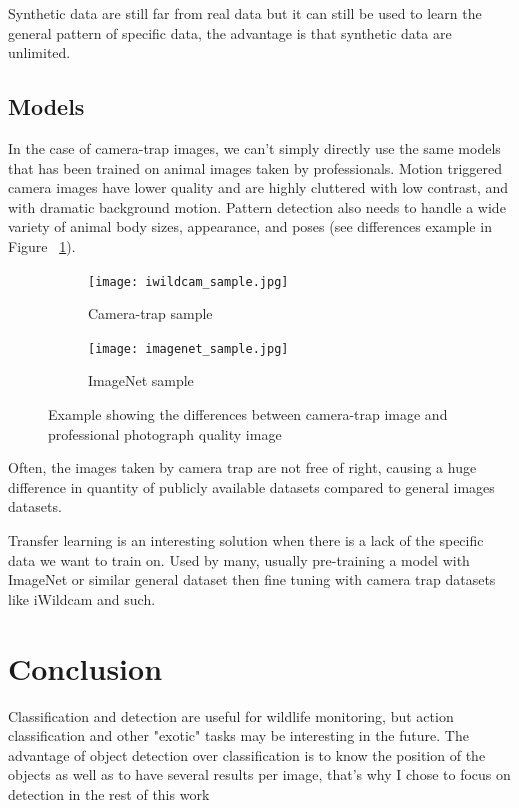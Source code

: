 Synthetic data are still far from real data but it can still be used to learn the general pattern of specific data, the advantage is that synthetic data are unlimited.

\pagebreak\subsection{Models}

In the case of camera-trap images, we can't simply directly use the same models that has been trained on animal images taken by professionals.
Motion triggered camera images have lower quality and are highly cluttered with low contrast, and with dramatic background motion. Pattern detection also needs to handle a wide variety of animal body sizes, appearance, and poses (see differences example in Figure ~\ref{fig:camtraprealcam}).

\begin{figure}[H]
\centering
\begin{subfigure}{.5\textwidth}
  \centering
  \texttt{[image: iwildcam\_sample.jpg]}
  \caption{Camera-trap sample}
\end{subfigure}%
\begin{subfigure}{.5\textwidth}
  \centering
  \texttt{[image: imagenet\_sample.jpg]}
  \caption{ImageNet sample}
\end{subfigure}
\caption[Camera-trap vs professional photography]{Example showing the differences between camera-trap image and professional photograph quality image}
\label{fig:camtraprealcam}
\end{figure}

Often, the images taken by camera trap are not free of right, causing a huge difference in quantity of publicly available datasets compared to general images datasets.

Transfer learning is an interesting solution when there is a lack of the specific data we want to train on.
Used by many\cite{feature_learning_bengio}\cite{decaf_feature}\cite{transfer_learning_bengio}\cite{dl__imagenet_seregenti_gomez}\cite{dl_imagenet_seregenti_norouzzadeh}, usually pre-training a model with ImageNet or similar general dataset then fine tuning with camera trap datasets like iWildcam and such.

\pagebreak\section{Conclusion}

Classification and detection are useful for wildlife monitoring, but action classification and other "exotic" tasks may be interesting in the future.
The advantage of object detection over classification is to know the position of the objects as well as to have several results per image, that's why I chose to focus on detection in the rest of this work